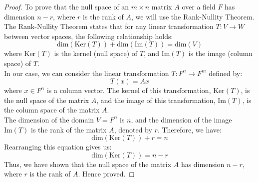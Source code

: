 \documentclass[openany]{book}
\begin{document}
\begin{proof}
To prove that the null space of an $m \times n$ matrix $A$ over a field $F$ has dimension $n - r$, where $r$ is the rank of $A$, we will use the Rank-Nullity Theorem. The Rank-Nullity Theorem states that for any linear transformation $T: V \to W$ between vector spaces, the following relationship holds:
$$\text{dim}(\text{Ker}(T)) + \text{dim}(\text{Im}(T)) = \text{dim}(V)$$
where $\text{Ker}(T)$ is the kernel (null space) of $T$, and $\text{Im}(T)$ is the image (column space) of $T$. \\
In our case, we can consider the linear transformation $T: F^n \to F^m$ defined by:
$$T(x) = Ax$$
where $x \in F^n$ is a column vector. The kernel of this transformation, $\text{Ker}(T)$, is the null space of the matrix $A$, and the image of this transformation, $\text{Im}(T)$, is the column space of the matrix $A$. \\
The dimension of the domain $V = F^n$ is $n$, and the dimension of the image $\text{Im}(T)$ is the rank of the matrix $A$, denoted by $r$. Therefore, we have:
$$\text{dim}(\text{Ker}(T)) + r = n$$
Rearranging this equation gives us:
$$\text{dim}(\text{Ker}(T)) = n - r$$
Thus, we have shown that the null space of the matrix $A$ has dimension $n - r$, where $r$ is the rank of $A$. Hence proved.
\end{proof}
\end{document}
